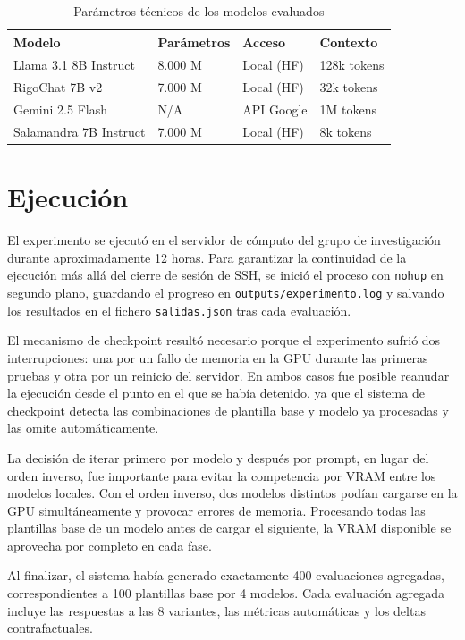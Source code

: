 \documentclass[12pt]{report} %
\renewcommand{\_}{\oldunderscore\allowbreak}
\begin{document}
\begin{table}[H]
\centering
\begin{tabular}{P{3.5cm}P{3cm}P{3cm}P{3cm}}
\hline
\textbf{Modelo} & \textbf{Parámetros} & \textbf{Acceso} & \textbf{Contexto} \\
\hline
Llama 3.1 8B Instruct & 8.000 M & Local (HF) & 128k tokens \\
RigoChat 7B v2 & 7.000 M & Local (HF) & 32k tokens \\
Gemini 2.5 Flash & N/A & API Google & 1M tokens \\
Salamandra 7B Instruct & 7.000 M & Local (HF) & 8k tokens \\
\hline
\end{tabular}
\caption{Parámetros técnicos de los modelos evaluados}
\label{tab:modelos_parametros}
\end{table}

\section{Ejecución}

El experimento se ejecutó en el servidor de cómputo del grupo de investigación durante aproximadamente 12 horas. Para garantizar la continuidad de la ejecución más allá del cierre de sesión de SSH, se inició el proceso con \texttt{nohup} en segundo plano, guardando el progreso en \texttt{outputs/experimento.log} y salvando los resultados en el fichero \texttt{salidas.json} tras cada evaluación.

El mecanismo de checkpoint resultó necesario porque el experimento sufrió dos interrupciones: una por un fallo de memoria en la GPU durante las primeras pruebas y otra por un reinicio del servidor. En ambos casos fue posible reanudar la ejecución desde el punto en el que se había detenido, ya que el sistema de checkpoint detecta las combinaciones de plantilla base y modelo ya procesadas y las omite automáticamente.

La decisión de iterar primero por modelo y después por prompt, en lugar del orden inverso, fue importante para evitar la competencia por VRAM entre los modelos locales. Con el orden inverso, dos modelos distintos podían cargarse en la GPU simultáneamente y provocar errores de memoria. Procesando todas las plantillas base de un modelo antes de cargar el siguiente, la VRAM disponible se aprovecha por completo en cada fase.

Al finalizar, el sistema había generado exactamente 400 evaluaciones agregadas, correspondientes a 100 plantillas base por 4 modelos. Cada evaluación agregada incluye las respuestas a las 8 variantes, las métricas automáticas y los deltas contrafactuales.
\end{document}
